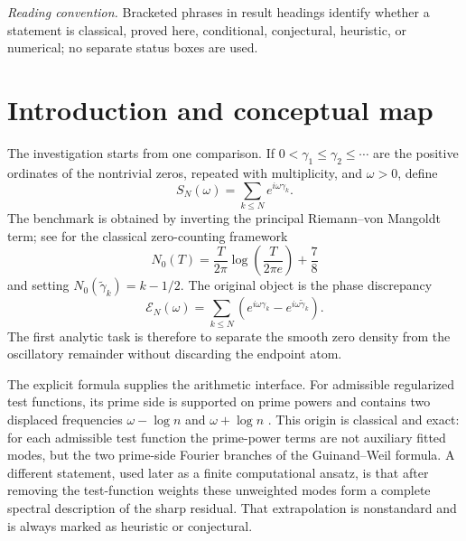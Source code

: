 \documentclass[11pt]{amsart}
\numberwithin{equation}{section}
\theoremstyle{plain}
\theoremstyle{definition}
\theoremstyle{remark}
\newcommand{\1}{\mathbf{1}}
\begin{document}
\maketitle
\tableofcontents

\bigskip

\noindent\emph{Reading convention.} Bracketed phrases in result headings identify whether a statement is classical, proved here, conditional, conjectural, heuristic, or numerical; no separate status boxes are used.

\section{Introduction and conceptual map}
\label{sec:introduction}

The investigation starts from one comparison.  If
$0<\gamma_1\leq\gamma_2\leq\cdots$ are the positive ordinates of the
nontrivial zeros, repeated with multiplicity, and $\omega>0$, define
\begin{equation}
S_N(\omega)=\sum_{k\leq N}e^{i\omega\gamma_k}.
\label{eq:intro_SN_omega}
\end{equation}
The benchmark is obtained by inverting the principal
Riemann--von Mangoldt term; see \cite{Edwards1974,Titchmarsh1986} for the
classical zero-counting framework
\begin{equation}
N_0(T)=\frac{T}{2\pi}\log\!\left(\frac{T}{2\pi e}\right)+\frac78
\label{eq:intro_N0}
\end{equation}
and setting $N_0(\widetilde\gamma_k)=k-1/2$.  The original object is the
phase discrepancy
\begin{equation}
\mathcal E_N(\omega)
=
\sum_{k\leq N}
\left(e^{i\omega\gamma_k}-e^{i\omega\widetilde\gamma_k}\right).
\label{eq:intro_discrepancy}
\end{equation}
The first analytic task is therefore to separate the smooth zero density from
the oscillatory remainder without discarding the endpoint atom.

The explicit formula supplies the arithmetic interface.  For admissible
regularized test functions, its prime side is supported on prime powers and
contains two displaced frequencies $\omega-\log n$ and
$\omega+\log n$ \cite{Guinand1947,Guinand1949,Guinand1948,Weil1952}.
This origin is classical and exact: for each admissible test function the
prime-power terms are not auxiliary fitted modes, but the two prime-side
Fourier branches of the Guinand--Weil formula.  A different statement, used
later as a finite computational ansatz, is that after removing the test-function
weights these unweighted modes form a complete spectral description of the
sharp residual.  That extrapolation is nonstandard and is always marked as
heuristic or conjectural.
\end{document}
